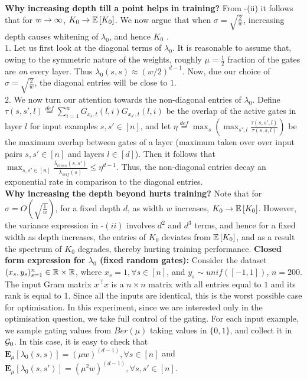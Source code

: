 \textbf{Why increasing depth till a point helps in training? } From -(ii) it follows that for $w\rightarrow\infty$, $K_0\rightarrow\mathbb{E}\left[K_0\right]$. We now argue that when $\sigma=\sqrt{\frac{2}{w}}$, increasing depth causes whitening of $\lambda_0$, and hence $K_0$ .\hfill\\
$1.$ Let us first look at the diagonal terms of $\lambda_0$. It is reasonable to assume that, owing to the symmetric nature of the weights, roughly $\mu=\frac{1}{2}$ fraction of the gates are \emph{on} every layer. Thus $\lambda_0(s,s)\approx (w/2)^{d-1}$. Now, due our choice of $\sigma=\sqrt{\frac{2}{w}}$, the diagonal entries will be close to $1$.\hfill\\
$2.$ We now turn our attention towards the non-diagonal entries of $\lambda_0$. Define $\tau(s,s',l)\stackrel{def}=\sum_{i=1}^w G_{x_s,t}(l,i)G_{x_{s'},t}(l,i)$ be the overlap of the active gates in layer $l$ for input examples $s,s'\in[n]$, and  let $\eta\stackrel{def}=\max_s\left(\max_{s',l} \frac{\tau(s,s',l)}{\tau(s,s,l)}\right)$ be the maximum overlap between gates of a layer (maximum taken over over input pairs $s,s'\in[n]$ and layers $l\in [d]$).  Then it follows that $\max_{s,s'\in [n]} \frac{\bar{\lambda}_{cross}(s,s')}{\bar{\lambda}_{self}(s)}\leq \eta^{d-1}$. Thus, the non-diagonal entries decay an exponential rate in comparison to the diagonal entries.\hfill\\
\textbf{Why increasing the depth beyond hurts training?} Note that for $\sigma=O\left(\sqrt{\frac{1}{w}}\right)$, for a fixed depth $d$, as width $w$ increases, $K_0\rightarrow\mathbb{E}\left[K_0\right]$. However, the variance expression in -$(ii)$ involves $d^2$ and $d^3$ terms, and hence for a fixed width as depth increases, the entries of $K_0$ deviates from $\mathbb{E}\left[K_0\right]$, and as a result the spectrum of $K_0$ degrades, thereby hurting training performance.
\textbf{Closed form expression for $\lambda_0$ (fixed random gates):} 
Consider the dataset $(x_s,y_s)_{s=1}^n\in \mathbb{R}\times \mathbb{R}$, where $x_s=1,\forall s\in [n]$, and $y_s\sim unif([-1,1])$, $n=200$. The input Gram matrix $x^\top x$ is a $n\times n$ matrix with all entries equal to $1$ and its rank is equal to 1. Since all the inputs are identical, this is the worst possible case for optimisation. In this experiment, since we are interested only in the optimisation question, we take full control of the gating. For each input example, we sample gating values from $Ber(\mu)$ taking values in $\{0,1\}$, and collect it in $\mathcal{G}_0$. In this case, it is easy to check that $\mathbf{E}_{\mu}\left[\lambda_0(s,s)\right]=(\mu w)^{(d-1)},\forall s\in[n]$ and $\mathbf{E}_{\mu}\left[\lambda_0(s,s')\right]=(\mu^2 w)^{(d-1)},\forall s,s'\in[n]$.\hfill\\
